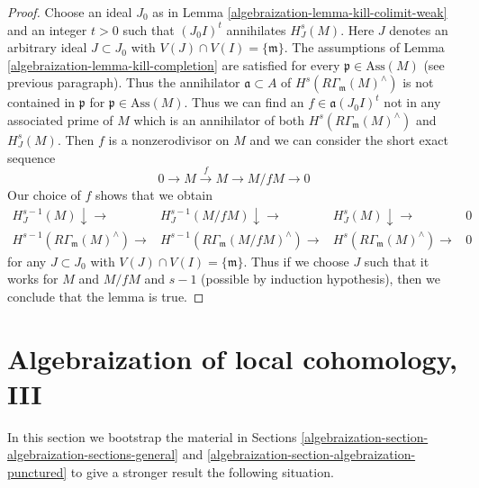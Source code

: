\begin{proof}
\medskip\noindent
Choose an ideal $J_0$ as in Lemma \ref{algebraization-lemma-kill-colimit-weak}
and an integer $t > 0$ such that $(J_0I)^t$ annihilates $H^s_J(M)$.
Here $J$ denotes an arbitrary ideal $J \subset J_0$ with
$V(J) \cap V(I) = \{\mathfrak m\}$.
The assumptions of Lemma \ref{algebraization-lemma-kill-completion}
are satisfied for every $\mathfrak p \in \text{Ass}(M)$
(see previous paragraph). Thus the annihilator $\mathfrak a \subset A$ of
$H^s(R\Gamma_\mathfrak m(M)^\wedge)$
is not contained in $\mathfrak p$ for $\mathfrak p \in \text{Ass}(M)$.
Thus we can find an $f \in \mathfrak a(J_0I)^t$
not in any associated prime of $M$ which is an annihilator
of both $H^s(R\Gamma_\mathfrak m(M)^\wedge)$ and $H^s_J(M)$.
Then $f$ is a nonzerodivisor on $M$ and we can consider the
short exact sequence
$$
0 \to M \xrightarrow{f} M \to M/fM \to 0
$$
Our choice of $f$ shows that we obtain
$$
\begin{array}{cccc}H^{s - 1}_J(M) \downarrow\longrightarrow & H^{s - 1}_J(M/fM) \downarrow\longrightarrow & H^s_J(M) \downarrow\longrightarrow & 0 \\ H^{s - 1}(R\Gamma_\mathfrak m(M)^\wedge) \longrightarrow & H^{s - 1}(R\Gamma_\mathfrak m(M/fM)^\wedge) \longrightarrow & H^s(R\Gamma_\mathfrak m(M)^\wedge) \longrightarrow & 0\end{array}
$$
for any $J \subset J_0$ with $V(J) \cap V(I) = \{\mathfrak m\}$.
Thus if we choose $J$ such that it works for
$M$ and $M/fM$ and $s - 1$ (possible by induction hypothesis),
then we conclude that the lemma is true.
\end{proof}

\section{Algebraization of local cohomology, III}
\label{algebraization-section-bootstrap}
In this section we bootstrap the material in
Sections \ref{algebraization-section-algebraization-sections-general} and
\ref{algebraization-section-algebraization-punctured}
to give a stronger result the following situation.

